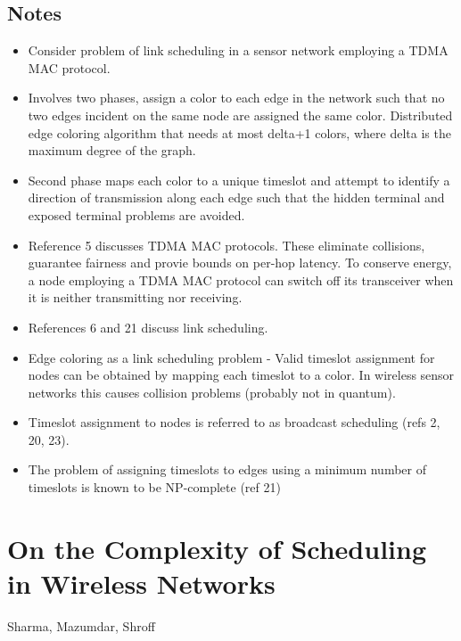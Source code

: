 \documentclass{article}
\begin{document}
\subsection{Notes}
\begin{itemize}
    \item Consider problem of link scheduling in a sensor network employing a TDMA MAC protocol.
    \item Involves two phases, assign a color to each edge in the network such that no two edges incident on the same node are assigned the same color.  Distributed edge coloring algorithm that needs at most delta+1 colors, where delta is the maximum degree of the graph.
    \item Second phase maps each color to a unique timeslot and attempt to identify a direction of transmission along each edge such that the hidden terminal and exposed terminal problems are avoided.
    \item Reference 5 discusses TDMA MAC protocols.  These eliminate collisions, guarantee fairness and provie bounds on per-hop latency.  To conserve energy, a node employing a TDMA MAC protocol can switch off its transceiver when it is neither transmitting nor receiving.
    \item References 6 and 21 discuss link scheduling.
    \item Edge coloring as a link scheduling problem - Valid timeslot assignment for nodes can be obtained by mapping each timeslot to a color.  In wireless sensor networks this causes collision problems (probably not in quantum).
    \item Timeslot assignment to nodes is referred to as broadcast scheduling (refs 2, 20, 23).
    \item The problem of assigning timeslots to edges using a minimum number of timeslots is known to be NP-complete (ref 21)
\end{itemize}

\section{On the Complexity of Scheduling in Wireless Networks}
Sharma, Mazumdar, Shroff
\end{document}
